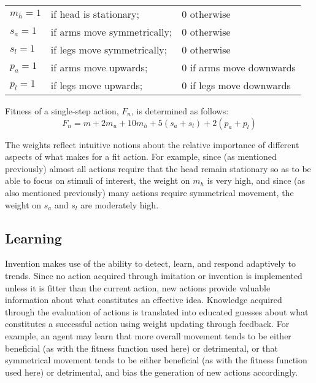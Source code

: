\documentclass[a4paper,12pt,man,british]{apa6}
\begin{document}
\vspace{2ex}
\hspace*{\fill}%
\begin{tabular}{l@{}p{2in}p{2in}}
$m_h = 1$ & if head is stationary;      &  0 otherwise \\
$s_a = 1$ & if arms move symmetrically; & 0 otherwise \\
$s_l = 1$ & if legs move symmetrically; & 0 otherwise \\
$p_a = 1$ & if arms move upwards;       & 0 if arms move downwards \\
$p_l = 1$ & if legs move upwards;       & 0 if legs move downwards \\
\end{tabular}%
\hspace*{\fill}
\vspace{2ex}

\noindent Fitness of a single-step action, $F_n$, is determined as follows: 
\begin{equation}
F_{n} = m + 2m_u + 10m_h + 5(s_a+s_l) + 2(p_a+p_l)  %
\label{eq:fitnesssingle}
\end{equation}

The weights reflect intuitive notions about the relative importance of different aspects of what makes for a fit action. For example, since (as mentioned previously) almost all actions require that the head remain stationary so as to be able to focus on stimuli of interest, the weight on $m_h$ is very high, and since (as also mentioned previously) many actions require symmetrical movement, the weight on $s_a$ and $s_l$ are moderately high.

\subsection{Learning}
Invention makes use of the ability to detect, learn, and respond adaptively to trends. Since no action acquired through imitation or invention is implemented unless it is fitter than the current action, new actions provide valuable information about what constitutes an effective idea. Knowledge acquired through the evaluation of actions is translated into educated guesses about what constitutes a successful action using weight updating through feedback. For example, an agent may learn that more overall movement tends to be either beneficial (as with the fitness function used here) or detrimental, or that symmetrical movement tends to be either beneficial (as with the fitness function used here) or detrimental, and bias the generation of new actions accordingly.
\end{document}
